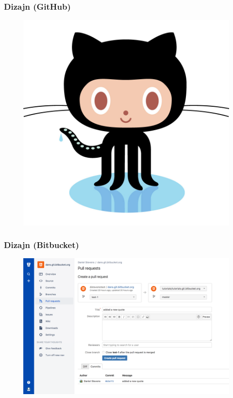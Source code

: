 \documentclass[12p, Times New Roman]{beamer}
\begin{document}
	\begin{frame} 			   %
		\frametitle{Dizajn (GitHub)}
		
		\begin{figure}
			\begin{center}
				\includegraphics[scale=0.1]{macka.png}
			\end{center}
		\end{figure}

	\end{frame}                              




	\begin{frame}				%
		\frametitle{Dizajn (Bitbucket)} 	
		\begin{figure}
			\begin{center}
				\includegraphics[scale=0.12]{Shot2.png}
			\end{center}
		\end{figure}

	\end{frame}
\end{document}
